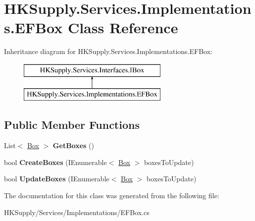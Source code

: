 \hypertarget{class_h_k_supply_1_1_services_1_1_implementations_1_1_e_f_box}{}\section{H\+K\+Supply.\+Services.\+Implementations.\+E\+F\+Box Class Reference}
\label{class_h_k_supply_1_1_services_1_1_implementations_1_1_e_f_box}
Inheritance diagram for H\+K\+Supply.\+Services.\+Implementations.\+E\+F\+Box\+:\begin{figure}[H]
\begin{center}
\leavevmode
\includegraphics[height=2.000000cm]{class_h_k_supply_1_1_services_1_1_implementations_1_1_e_f_box}
\end{center}
\end{figure}
\subsection*{Public Member Functions}
\begin{DoxyCompactItemize}
\item 
\mbox{\label{class_h_k_supply_1_1_services_1_1_implementations_1_1_e_f_box_afbe52ad0083ded136a2b83c0c4483524}} 
List$<$ \mbox{\hyperlink{class_h_k_supply_1_1_models_1_1_supply_1_1_box}{Box}} $>$ {\bfseries Get\+Boxes} ()
\item 
\mbox{\label{class_h_k_supply_1_1_services_1_1_implementations_1_1_e_f_box_ac85520755ea3f2ba7197da66a5d75d6e}} 
bool {\bfseries Create\+Boxes} (I\+Enumerable$<$ \mbox{\hyperlink{class_h_k_supply_1_1_models_1_1_supply_1_1_box}{Box}} $>$ boxes\+To\+Update)
\item 
\mbox{\label{class_h_k_supply_1_1_services_1_1_implementations_1_1_e_f_box_a779c937421ef90adea6371a2908216af}} 
bool {\bfseries Update\+Boxes} (I\+Enumerable$<$ \mbox{\hyperlink{class_h_k_supply_1_1_models_1_1_supply_1_1_box}{Box}} $>$ boxes\+To\+Update)
\end{DoxyCompactItemize}


The documentation for this class was generated from the following file\+:\begin{DoxyCompactItemize}
\item 
H\+K\+Supply/\+Services/\+Implementations/E\+F\+Box.\+cs\end{DoxyCompactItemize}
